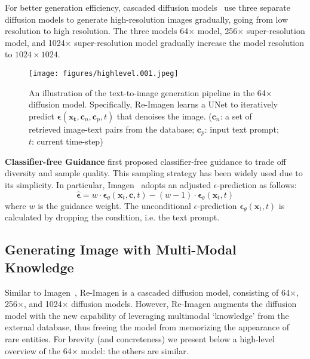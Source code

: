 \documentclass{article} \usepackage{iclr2023_conference,times}
\newcommand{\modelname}{{Re-Imagen}\xspace}
\begin{document}
For better generation efficiency, cascaded diffusion models~\citep{ho2022cascaded,ramesh2022hierarchical,saharia2022photorealistic} use three separate diffusion models to generate high-resolution images gradually, going from low resolution to high resolution. The three models 64$\times$ model, 256$\times$ super-resolution model, and 1024$\times$ super-resolution model gradually increase the model resolution to $1024\times1024$.



\begin{figure}[!t]
    \centering
    \texttt{[image: figures/highlevel.001.jpeg]}
    \caption{
        An illustration of the text-to-image generation pipeline in the 64$\times$ diffusion model. Specifically, \modelname learns a UNet to iteratively predict $\bm{\epsilon}(\bm{x_t}, \bm{c}_n, \bm{c}_p, t)$ that denoises the image. ($\bm{c}_n$: a set of retrieved image-text pairs from the database; $\bm{c}_p$: input text prompt; $t$: current time-step) 
    }
    \label{fig:model}
\end{figure}

\noindent \textbf{Classifier-free Guidance}
\label{sec:cfg}
\cite{ho2021classifier} first proposed classifier-free guidance to trade off diversity and sample quality. This sampling strategy has been widely used due to its simplicity. In particular, Imagen~\citep{saharia2022photorealistic} adopts an adjusted $\epsilon$-prediction as follows:
\begin{equation}
    \hat{\bm{\epsilon}} = w \cdot \bm{\epsilon}_{\theta}(\bm{x}_t, \bm{c}, t) - (w - 1) \cdot \bm{\epsilon}_{\theta}(\bm{x}_t, t)
\end{equation}
where $w$ is the guidance weight. The unconditional $\epsilon$-prediction $\bm{\epsilon}_{\theta}(\bm{x}_t, t)$ is calculated by dropping the condition, i.e. the text prompt.

\subsection{Generating Image with Multi-Modal Knowledge}

Similar to Imagen~\citep{saharia2022photorealistic},  \modelname is a cascaded diffusion model, consisting of 64$\times$, 256$\times$, and 1024$\times$ diffusion models. However, \modelname augments the diffusion model with the new capability of leveraging multimodal `knowledge' from the external database, thus freeing the model from memorizing the appearance of rare entities. For brevity (and concreteness) we present below a  high-level overview of the 64$\times$ model: the others are similar.
\end{document}
